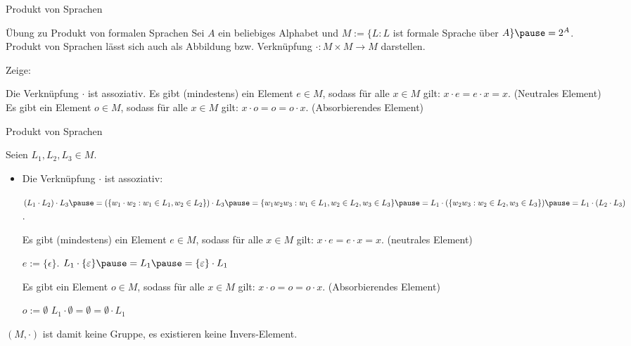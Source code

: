 \begin{frame}{Produkt von Sprachen}	
	\begin{taskblock}{Übung zu Produkt von formalen Sprachen}
		Sei $A$ ein beliebiges Alphabet und $M := \{L : L $ ist formale Sprache über $A \} \pause = 2^A$. \pause Produkt von Sprachen lässt sich auch als Abbildung bzw. Verknüpfung $\cdot : M \times M \rightarrow M$ darstellen.
		
		Zeige: 
		\begin{itemize}
			\pitem Die Verknüpfung $\cdot$ ist assoziativ.
			\pitem Es gibt (mindestens) ein Element $e \in M$, sodass für alle $x \in M$ gilt: $x \cdot e = e \cdot x = x$. (Neutrales Element)
			\pitem Es gibt ein Element $o \in M$, sodass für alle $x \in M$ gilt: $x \cdot o = o = o \cdot x$. (Absorbierendes Element)
		\end{itemize}
	\end{taskblock}
\end{frame}

\begin{frame}{Produkt von Sprachen}
	\pause 
	
	Seien $L_1, L_2, L_3 \in M$.
	
	\begin{itemize}
		\item Die Verknüpfung $\cdot$ ist assoziativ:
		\begin{itemize}
			\pitem $(L_1 \cdot L_2) \cdot L_3 \pause = (\{w_1\cdot w_2 : w_1 \in L_1, w_2 \in L_2\}) \cdot L_3 \pause = \{w_1w_2w_3 : w_1 \in L_1, w_2 \in L_2, w_3 \in L_3\} \pause = L_1 \cdot (\{w_2w_3 : w_2 \in L_2, w_3 \in L_3\}) \pause = L_1 \cdot (L_2 \cdot L_3)$.
		\end{itemize}
	
		\pitem Es gibt (mindestens) ein Element $e \in M$, sodass für alle $x \in M$ gilt: $x \cdot e = e \cdot x = x$. (neutrales Element)
		\begin{itemize}
			\pitem $e := \{\epsilon\}$.
			\pitem $L_1 \cdot \{\epsilon\} \pause = L_1 \pause = \{\epsilon\} \cdot L_1$
		\end{itemize}
	
		\pitem Es gibt ein Element $o \in M$, sodass für alle $x \in M$ gilt: $x \cdot o = o = o \cdot x$. (Absorbierendes Element)
		\begin{itemize}
			\pitem $o := \emptyset$
			\pitem $L_1 \cdot \emptyset = \emptyset = \emptyset \cdot L_1$
		\end{itemize}
	\end{itemize}

	$(M, \cdot)$ ist damit keine Gruppe\p , es existieren keine Invers-Element.
\end{frame}

